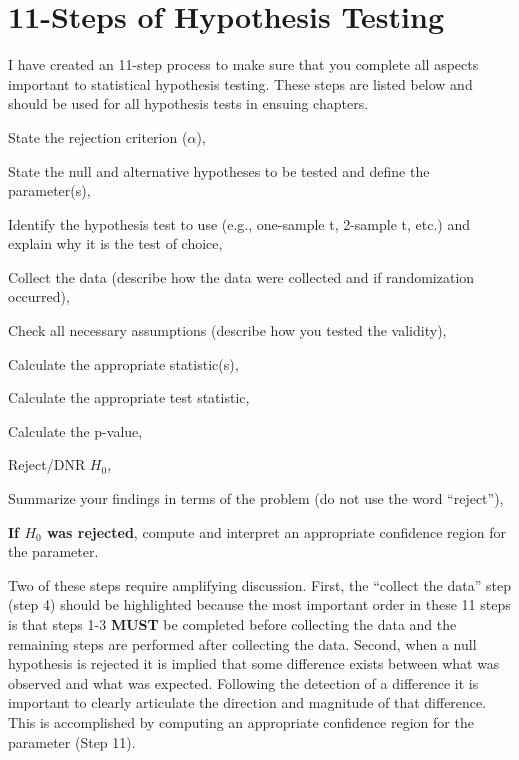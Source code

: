 \documentclass[10pt,openany]{book}\usepackage[]{graphicx}\usepackage[]{color}
\begin{document}
\section{11-Steps of Hypothesis Testing}  \label{sec:11Steps}
I have created an 11-step process to make sure that you complete all aspects important to statistical hypothesis testing.  These steps are listed below and should be used for all hypothesis tests in ensuing chapters.
\begin{Enumerate}
  \item State the rejection criterion ($\alpha$),
  \item State the null and alternative hypotheses to be tested and define the parameter(s),
  \item Identify the hypothesis test to use (e.g., one-sample t, 2-sample t, etc.) and explain why it is the test of choice,
  \item Collect the data (describe how the data were collected and if randomization occurred),
  \item Check all necessary assumptions (describe how you tested the validity),
  \item Calculate the appropriate statistic(s),
  \item Calculate the appropriate test statistic,
  \item Calculate the p-value,
  \item Reject/DNR $H_{0}$,
  \item Summarize your findings in terms of the problem (do not use the word ``reject''),
  \item \textbf{If $H_{0}$ was rejected}, compute and interpret an appropriate confidence region for the parameter.
\end{Enumerate}

Two of these steps require amplifying discussion.  First, the ``collect the data'' step (step 4) should be highlighted because the most important order in these 11 steps is that steps 1-3 \textbf{MUST} be completed before collecting the data and the remaining steps are performed after collecting the data.  Second, when a null hypothesis is rejected it is implied that some difference exists between what was observed and what was expected.  Following the detection of a difference it is important to clearly articulate the direction and magnitude of that difference.  This is accomplished by computing an appropriate confidence region for the parameter (Step 11).

\end{document}
